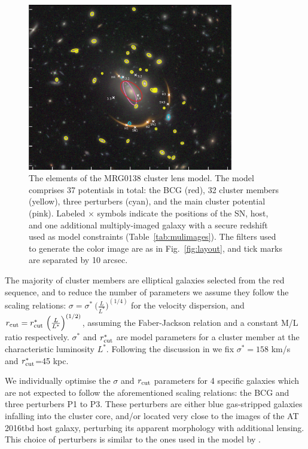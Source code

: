 \documentclass[12pt]{article}
\def\SNABC{AT 2016tbd\xspace}
\begin{document}
\begin{figure}
    \centering
    \includegraphics[width=0.8\textwidth]{Paper/Figures/fig4_lensmodel_layout.pdf}
    \caption{
    The elements of the MRG0138 cluster lens model. The model comprises 37 potentials in total: the BCG (red), 32 cluster members (yellow), three perturbers (cyan), and the main cluster potential (pink).  Labeled $\times$ symbols indicate the positions of the SN, host, and one additional multiply-imaged galaxy with a secure redshift used as model constraints (Table~\ref{tab:mulimages}).  The filters used to generate the color image are as in Fig.~\ref{fig:layout}, and tick marks are separated by 10 arcsec.
    }
    \label{fig:model_components}
\end{figure}


The majority of cluster members are elliptical galaxies selected from the red sequence, and to reduce the number of parameters we assume they follow the scaling relations: $\sigma=\sigma^*\ {\Big(\frac{L}{L^*}\Big)}^{(1/4)}$ for the velocity dispersion, 
and $r_{\rm cut}=r_{\rm cut}^*\ {\Big(\frac{L}{L^*}\Big)}^{(1/2)}$, assuming the Faber-Jackson relation and a constant M/L ratio respectively. $\sigma^*$ and $r^*_{\rm cut}$ are model parameters for a cluster member at the characteristic luminosity $L^*$.  Following the discussion in \cite{richard_locuss_2010} we fix $\sigma^*=158$ km/s and $r_{\rm cut}^*$=45 kpc. 

We individually optimise the $\sigma$ and $r_{\rm cut}$ parameters for 4 specific galaxies which are not expected to follow the aforementioned scaling relations: the BCG and three perturbers P1 to P3. These perturbers are either blue gas-stripped galaxies infalling into the cluster core, and/or located very close to the images of the \SNABC host galaxy, perturbing its apparent morphology with additional lensing. This choice of perturbers is similar to the ones used in the model by \cite{newman_resolving_2018}. 
\end{document}
